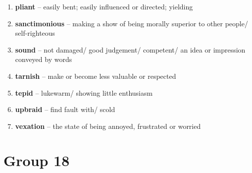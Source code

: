 \begin{enumerate}[wide,labelindent=0pt]
\item \textbf{pliant} -- easily bent; easily influenced or directed; yielding
\item \textbf{sanctimonious} -- making a show of being morally superior to other people/ self-righteous
\item \textbf{sound} -- not damaged/ good judgement/ competent/ an idea or impression conveyed by words
\item \textbf{tarnish} -- make or become less valuable or respected
\item \textbf{tepid} -- lukewarm/ showing little enthusiasm
\item \textbf{upbraid} -- find fault with/ scold
\item \textbf{vexation} -- the state of being annoyed, frustrated or worried
\end{enumerate}

\newpage
\section{Group 18}

